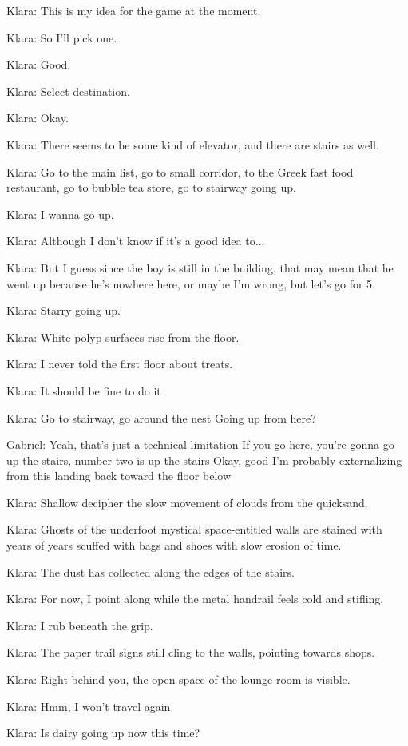Klara: This is my idea for the game at the moment.

Klara: So I'll pick one.

Klara: Good.

Klara: Select destination.

Klara: Okay.

Klara: There seems to be some kind of elevator, and there are stairs as well.

Klara: Go to the main list, go to small corridor, to the Greek fast food restaurant, go to bubble tea store, go to stairway going up.

Klara: I wanna go up.

Klara: Although I don't know if it's a good idea to...

Klara: But I guess since the boy is still in the building, that may mean that he went up because he's nowhere here, or maybe I'm wrong, but let's go for 5.

Klara: Starry going up.

Klara: White polyp surfaces rise from the floor.

Klara: I never told the first floor about treats.

Klara: It should be fine to do it

Klara: Go to stairway, go around the nest Going up from here?

Gabriel: Yeah, that's just a technical limitation If you go here, you're gonna go up the stairs, number two is up the stairs Okay, good I'm probably externalizing from this landing back toward the floor below

Klara: Shallow decipher the slow movement of clouds from the quicksand.

Klara: Ghosts of the underfoot mystical space-entitled walls are stained with years of years scuffed with bags and shoes with slow erosion of time.

Klara: The dust has collected along the edges of the stairs.

Klara: For now, I point along while the metal handrail feels cold and stifling.

Klara: I rub beneath the grip.

Klara: The paper trail signs still cling to the walls, pointing towards shops.

Klara: Right behind you, the open space of the lounge room is visible.

Klara: Hmm, I won't travel again.

Klara: Is dairy going up now this time?

